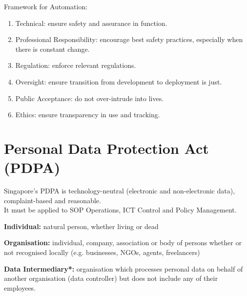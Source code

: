\documentclass[12pt, a4paper]{article}
\begin{document}
\begin{multicols*}{3}
Framework for Automation:
\begin{enumerate}[\roman*.]
  \item Technical: ensure safety and assurance in function.
  \item Professional Responsibility: encourage best safety practices, especially when there is constant change.
  \item Regulation: enforce relevant regulations.
  \item Oversight: ensure transition from development to deployment is just.
  \item Public Acceptance: do not over-intrude into lives.
  \item Ethics: ensure transparency in use and tracking.
\end{enumerate}

\section{Personal Data Protection Act (PDPA)}
Singapore's PDPA is technology-neutral (electronic and non-electronic data), complaint-based and reasonable. \\It must be applied to SOP Operations, ICT Control and Policy Management.

\textbf{Individual:} natural person, whether living or dead

\textbf{Organisation:} individual, company, association or body of persons whether or not recognised locally (e.g. businesses, NGOs, agents, freelancers)

\textbf{Data Intermediary*:} organisation which processes personal data on behalf of another organisation (data controller) but does not include any of their employees.


\end{multicols*}
\end{document}
